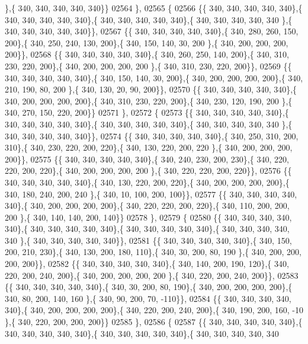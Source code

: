 \begin{DoxyCode}
      \},\{ 340, 340, 340, 340, 340\}\}
02564 \},
02565 \{
02566 \{\{ 340, 340, 340, 340, 340\},\{ 340, 340, 340, 340, 340\},\{ 340, 340, 340, 340, 340\},\{ 340, 340, 340, 340, 340
      \},\{ 340, 340, 340, 340, 340\}\},
02567 \{\{ 340, 340, 340, 340, 340\},\{ 340, 280, 260, 150, 200\},\{ 340, 250, 240, 130, 200\},\{ 340, 150, 140,  30, 200
      \},\{ 340, 200, 200, 200, 200\}\},
02568 \{\{ 340, 340, 340, 340, 340\},\{ 340, 260, 250, 140, 200\},\{ 340, 310, 230, 220, 200\},\{ 340, 200, 200, 200, 200
      \},\{ 340, 310, 230, 220, 200\}\},
02569 \{\{ 340, 340, 340, 340, 340\},\{ 340, 150, 140,  30, 200\},\{ 340, 200, 200, 200, 200\},\{ 340, 210, 190,  80, 200
      \},\{ 340, 130,  20,  90, 200\}\},
02570 \{\{ 340, 340, 340, 340, 340\},\{ 340, 200, 200, 200, 200\},\{ 340, 310, 230, 220, 200\},\{ 340, 230, 120, 190, 200
      \},\{ 340, 270, 150, 220, 200\}\}
02571 \},
02572 \{
02573 \{\{ 340, 340, 340, 340, 340\},\{ 340, 340, 340, 340, 340\},\{ 340, 340, 340, 340, 340\},\{ 340, 340, 340, 340, 340
      \},\{ 340, 340, 340, 340, 340\}\},
02574 \{\{ 340, 340, 340, 340, 340\},\{ 340, 250, 310, 200, 310\},\{ 340, 230, 220, 200, 220\},\{ 340, 130, 220, 200, 220
      \},\{ 340, 200, 200, 200, 200\}\},
02575 \{\{ 340, 340, 340, 340, 340\},\{ 340, 240, 230, 200, 230\},\{ 340, 220, 220, 200, 220\},\{ 340, 200, 200, 200, 200
      \},\{ 340, 220, 220, 200, 220\}\},
02576 \{\{ 340, 340, 340, 340, 340\},\{ 340, 130, 220, 200, 220\},\{ 340, 200, 200, 200, 200\},\{ 340, 180, 240, 200, 240
      \},\{ 340,  10, 100, 200, 100\}\},
02577 \{\{ 340, 340, 340, 340, 340\},\{ 340, 200, 200, 200, 200\},\{ 340, 220, 220, 200, 220\},\{ 340, 110, 200, 200, 200
      \},\{ 340, 140, 140, 200, 140\}\}
02578 \},
02579 \{
02580 \{\{ 340, 340, 340, 340, 340\},\{ 340, 340, 340, 340, 340\},\{ 340, 340, 340, 340, 340\},\{ 340, 340, 340, 340, 340
      \},\{ 340, 340, 340, 340, 340\}\},
02581 \{\{ 340, 340, 340, 340, 340\},\{ 340, 150, 200, 210, 230\},\{ 340, 130, 200, 180, 110\},\{ 340,  30, 200,  80, 190
      \},\{ 340, 200, 200, 200, 200\}\},
02582 \{\{ 340, 340, 340, 340, 340\},\{ 340, 140, 200, 190, 120\},\{ 340, 220, 200, 240, 200\},\{ 340, 200, 200, 200, 200
      \},\{ 340, 220, 200, 240, 200\}\},
02583 \{\{ 340, 340, 340, 340, 340\},\{ 340,  30, 200,  80, 190\},\{ 340, 200, 200, 200, 200\},\{ 340,  80, 200, 140, 160
      \},\{ 340,  90, 200,  70, -110\}\},
02584 \{\{ 340, 340, 340, 340, 340\},\{ 340, 200, 200, 200, 200\},\{ 340, 220, 200, 240, 200\},\{ 340, 190, 200, 160, -10
      \},\{ 340, 220, 200, 200, 200\}\}
02585 \},
02586 \{
02587 \{\{ 340, 340, 340, 340, 340\},\{ 340, 340, 340, 340, 340\},\{ 340, 340, 340, 340, 340\},\{ 340, 340, 340, 340, 340

\end{DoxyCode}
